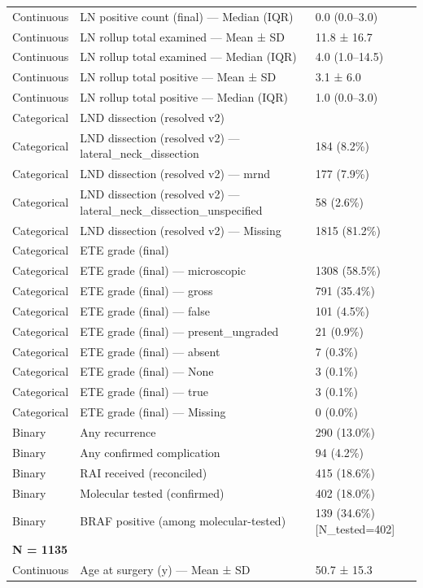 \begin{table}[htbp]
\begin{tabular}{lll}
Continuous & LN positive count (final) — Median (IQR) & 0.0 (0.0–3.0) \\
Continuous & LN rollup total examined — Mean ± SD & 11.8 ± 16.7 \\
Continuous & LN rollup total examined — Median (IQR) & 4.0 (1.0–14.5) \\
Continuous & LN rollup total positive — Mean ± SD & 3.1 ± 6.0 \\
Continuous & LN rollup total positive — Median (IQR) & 1.0 (0.0–3.0) \\
Categorical & LND dissection (resolved v2) &  \\
Categorical & LND dissection (resolved v2) — lateral\_neck\_dissection & 184 (8.2\%) \\
Categorical & LND dissection (resolved v2) — mrnd & 177 (7.9\%) \\
Categorical & LND dissection (resolved v2) — lateral\_neck\_dissection\_unspecified & 58 (2.6\%) \\
Categorical & LND dissection (resolved v2) — Missing & 1815 (81.2\%) \\
Categorical & ETE grade (final) &  \\
Categorical & ETE grade (final) — microscopic & 1308 (58.5\%) \\
Categorical & ETE grade (final) — gross & 791 (35.4\%) \\
Categorical & ETE grade (final) — false & 101 (4.5\%) \\
Categorical & ETE grade (final) — present\_ungraded & 21 (0.9\%) \\
Categorical & ETE grade (final) — absent & 7 (0.3\%) \\
Categorical & ETE grade (final) — None & 3 (0.1\%) \\
Categorical & ETE grade (final) — true & 3 (0.1\%) \\
Categorical & ETE grade (final) — Missing & 0 (0.0\%) \\
Binary & Any recurrence & 290 (13.0\%) \\
Binary & Any confirmed complication & 94 (4.2\%) \\
Binary & RAI received (reconciled) & 415 (18.6\%) \\
Binary & Molecular tested (confirmed) & 402 (18.0\%) \\
Binary & BRAF positive (among molecular-tested) & 139 (34.6\%) [N\_tested=402] \\
\multicolumn{3}{l}{\textbf{N = 1135}} \\
Continuous & Age at surgery (y) — Mean ± SD & 50.7 ± 15.3 \\

\end{tabular}
\end{table}

